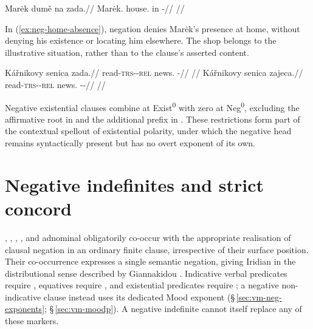 \ex\label{ex:neg-home-absence}%
\begingl
\gla Marėk dumě na zada.//
\glb Marėk.\Dir{} house.\Ind{} in \NegExst{}-\Cont{}//
\glft {}
//
\endgl
\xe

In (\ref{ex:neg-home-absence}), negation denies Marėk's presence at home,
without denying his existence or locating him elsewhere. The shop belongs
to the illustrative situation, rather than to the clause's asserted content.

\pex
\a
\begingl
\gla Kářnikovy senica zada.//
\glb read-\textsc{trs}-\Pf{}-\textsc{rel} news.\Dir{} \NegExst{}-\Cont{}//
\glft {}
//
\endgl
\a
\begingl
\gla {*}Kářnikovy senica zajeca.//
\glb read-\textsc{trs}-\Pf{}-\textsc{rel} news.\Dir{} \Neg{}-\Exst{}-\Cont{}//
\glft {} //
\endgl
\xe

Negative existential clauses combine  at Exist\textsuperscript{0}
with zero at Neg\textsuperscript{0}, excluding the affirmative root in
 and the additional prefix in . These restrictions
form part of the contextual spellout of existential polarity, under which the
negative head remains syntactically present but has no overt exponent of its
own.


\section{Negative indefinites and strict concord}
\label{sec:nm-negative-concord}\label{sec:vm-negative-concord}
 ,  , 
,  , and adnominal 
 obligatorily co-occur with the appropriate realisation of
clausal negation in an ordinary finite clause, irrespective of their surface
position. Their co-occurrence expresses a single semantic negation, giving
Iridian  in the distributional sense described
by Giannakidou \cite{giannakidou2006}. Indicative verbal predicates require
, equatives require , and existential predicates require
; a negative non-indicative clause instead uses its dedicated Mood
exponent (§\,\ref{sec:vm-neg-exponents}; §\,\ref{sec:vm-moodp}). A
negative indefinite cannot itself replace any of these markers.

